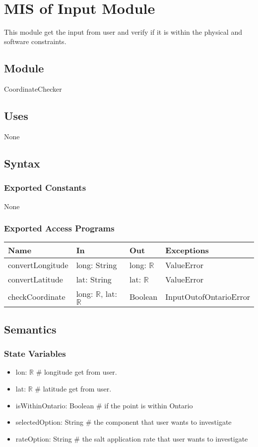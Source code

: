 \documentclass[12pt, titlepage]{article}
\begin{document}
~\newpage

\section{MIS of Input Module} \label{inputModule} 
This module get the input from user and verify if it is within the physical and software constraints.
\subsection{Module}
CoordinateChecker
\subsection{Uses}
None

\subsection{Syntax}

\subsubsection{Exported Constants}
None

\subsubsection{Exported Access Programs}

\begin{center}
\begin{tabular}{p{4cm} p{3.5cm} p{1.5cm} p{4.5cm}}
\hline
\textbf{Name} & \textbf{In} & \textbf{Out} & \textbf{Exceptions} \\
\hline
convertLongitude & long: String & long: $\mathbb{R}$ & ValueError \\
convertLatitude & lat: String & lat: $\mathbb{R}$ & ValueError \\
checkCoordinate & long: $\mathbb{R}$, lat: $\mathbb{R}$ & Boolean & InputOutofOntarioError \\

\hline
\end{tabular}
\end{center}

\subsection{Semantics}

\subsubsection{State Variables}
\begin{itemize}
\item lon: $\mathbb{R}$ \# longitude get from user.
\item lat: $\mathbb{R}$ \# latitude get from user.
\item isWithinOntario: Boolean \# if the point is within Ontario
\item selectedOption: String \# the component that user wants to investigate
\item rateOption: String \# the salt application rate that user wants to investigate
\end{itemize}
\end{document}
